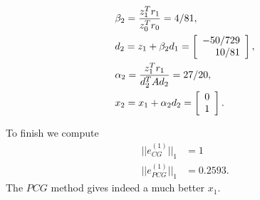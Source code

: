 \begin{questions}
\begin{solution}
\begin{itemize}
\begin{align*}
&\beta_2=\frac{z_1^Tr_1}{z_0^Tr_0}=4/81,\\
&d_2=z_1+\beta_2d_1=\left[
	\begin{array}{r r} 
	-50/729 \\
	10/81 \\
	\end{array} \right],\\
&\alpha_2=\frac{z_1^Tr_1}{d_2^TAd_2}=27/20,\\
&x_2=x_1+\alpha_2d_2=\left[
	\begin{array}{r r} 
	0 \\
	1 \\
	\end{array} \right].\\		
\end{align*}
\end{itemize}
To finish we compute
\begin{align*}
||e^{(1)}_{CG}||_1&=1\\
||e^{(1)}_{PCG}||_1&=0.2593.
\end{align*}
The $PCG$ method gives indeed a much better $x_1$.
\end{solution}
\end{questions}
